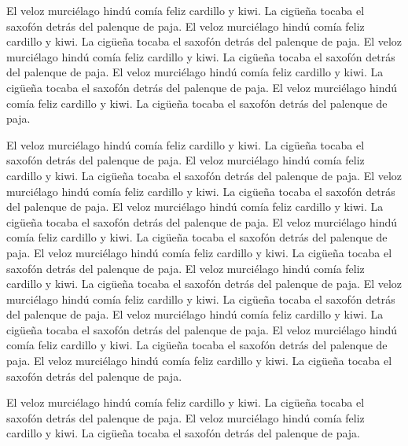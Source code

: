 \documentclass[a4paper,11pt,oneside]{report}
\begin{document}
El veloz murciélago hindú comía feliz cardillo y kiwi. La cigüeña tocaba el
saxofón detrás del palenque de paja.
El veloz murciélago hindú comía feliz cardillo y kiwi. La cigüeña tocaba el
saxofón detrás del palenque de paja.
El veloz murciélago hindú comía feliz cardillo y kiwi. La cigüeña tocaba el
saxofón detrás del palenque de paja.
El veloz murciélago hindú comía feliz cardillo y kiwi. La cigüeña tocaba el
saxofón detrás del palenque de paja.
El veloz murciélago hindú comía feliz cardillo y kiwi. La cigüeña tocaba el
saxofón detrás del palenque de paja.

El veloz murciélago hindú comía feliz cardillo y kiwi. La cigüeña tocaba el
saxofón detrás del palenque de paja.
El veloz murciélago hindú comía feliz cardillo y kiwi. La cigüeña tocaba el
saxofón detrás del palenque de paja.
El veloz murciélago hindú comía feliz cardillo y kiwi. La cigüeña tocaba el
saxofón detrás del palenque de paja.
El veloz murciélago hindú comía feliz cardillo y kiwi. La cigüeña tocaba el
saxofón detrás del palenque de paja.
El veloz murciélago hindú comía feliz cardillo y kiwi. La cigüeña tocaba el
saxofón detrás del palenque de paja.
El veloz murciélago hindú comía feliz cardillo y kiwi. La cigüeña tocaba el
saxofón detrás del palenque de paja.
El veloz murciélago hindú comía feliz cardillo y kiwi. La cigüeña tocaba el
saxofón detrás del palenque de paja.
El veloz murciélago hindú comía feliz cardillo y kiwi. La cigüeña tocaba el
saxofón detrás del palenque de paja.
El veloz murciélago hindú comía feliz cardillo y kiwi. La cigüeña tocaba el
saxofón detrás del palenque de paja.
El veloz murciélago hindú comía feliz cardillo y kiwi. La cigüeña tocaba el
saxofón detrás del palenque de paja.
El veloz murciélago hindú comía feliz cardillo y kiwi. La cigüeña tocaba el
saxofón detrás del palenque de paja.

El veloz murciélago hindú comía feliz cardillo y kiwi. La cigüeña tocaba el
saxofón detrás del palenque de paja.
El veloz murciélago hindú comía feliz cardillo y kiwi. La cigüeña tocaba el
saxofón detrás del palenque de paja.
\end{document}
